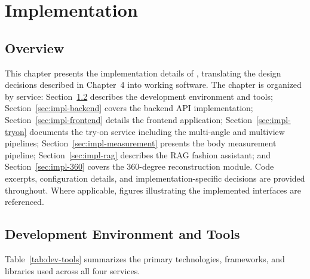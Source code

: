 \chapter{Implementation}

\section{Overview}
This chapter presents the implementation details of \projectname, translating the design decisions described in Chapter~4 into working software. The chapter is organized by service: Section~\ref{sec:impl-env} describes the development environment and tools; Section~\ref{sec:impl-backend} covers the backend API implementation; Section~\ref{sec:impl-frontend} details the frontend application; Section~\ref{sec:impl-tryon} documents the try-on service including the multi-angle and multiview pipelines; Section~\ref{sec:impl-measurement} presents the body measurement pipeline; Section~\ref{sec:impl-rag} describes the RAG fashion assistant; and Section~\ref{sec:impl-360} covers the 360-degree reconstruction module. Code excerpts, configuration details, and implementation-specific decisions are provided throughout. Where applicable, figures illustrating the implemented interfaces are referenced.

\section{Development Environment and Tools}
\label{sec:impl-env}

Table~\ref{tab:dev-tools} summarizes the primary technologies, frameworks, and libraries used across all four services.

